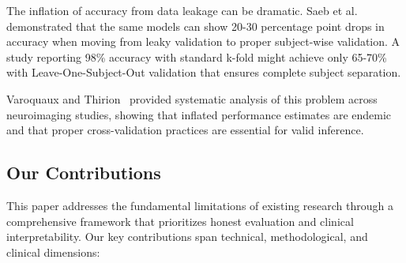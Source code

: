\documentclass[blue,fullpaper]{ludusofficial}  %
\begin{document}
The inflation of accuracy from data leakage can be dramatic. Saeb et al.~\cite{saeb2017need} demonstrated that the same models can show 20-30 percentage point drops in accuracy when moving from leaky validation to proper subject-wise validation. A study reporting 98\% accuracy with standard k-fold might achieve only 65-70\% with Leave-One-Subject-Out validation that ensures complete subject separation.

Varoquaux and Thirion~\cite{varoquaux2017assessing} provided systematic analysis of this problem across neuroimaging studies, showing that inflated performance estimates are endemic and that proper cross-validation practices are essential for valid inference.

\subsection{Our Contributions}

This paper addresses the fundamental limitations of existing research through a comprehensive framework that prioritizes honest evaluation and clinical interpretability. Our key contributions span technical, methodological, and clinical dimensions:
\end{document}
